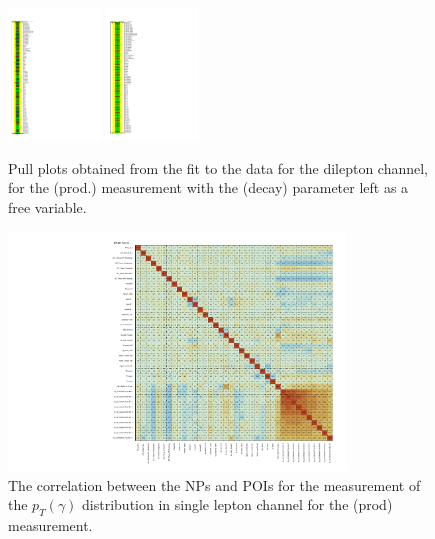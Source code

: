\begin{figure}[ht]
  \centering
  \includegraphics[width=0.22\textwidth]{figures/diff_xsec/dilep_tty_prod_mu_blinded/compare_NP_pulls/compare_NP_dilep_fits_detall_dphill_eta/NuisPar_comp.pdf}
  \quad \quad
  \includegraphics[width=0.22\textwidth]{figures/diff_xsec/dilep_tty_prod_mu_blinded/compare_NP_pulls/compare_NP_dilep_fits_drphb_drlj/NuisPar_comp.pdf}
  \caption{Pull plots obtained from the fit to the data for the dilepton channel, for the \tty (prod.) measurement
  with the \tty (decay) parameter left as a free variable.}
  \label{fig:pull_plot_pt_tty_dec_free_dilep_mu_blinded_2}
\end{figure}
\FloatBarrier



\begin{figure}[ht]
  \centering
  \includegraphics[width=0.8\textwidth]{figures/diff_xsec/ljet_tty_prod_mu_blinded/correlations/tty1l_pt_all_syst/CorrMatrix.pdf}
  \caption{The correlation between the NPs and POIs for the measurement of 
  the $p_T(\gamma)$ distribution in single lepton channel for the \tty(prod) measurement.}
  \label{fig:NP-corr_ljet_mu_blinded}
\end{figure}
\FloatBarrier


